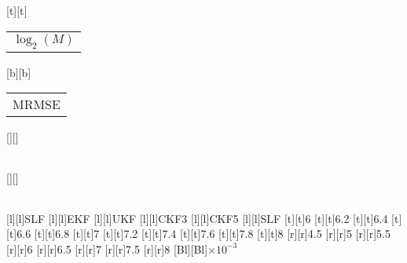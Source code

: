 %
%
[t][t]{\color[rgb]{0,0,0}\setlength{\tabcolsep}{0pt}\begin{tabular}{c}$\log_2 (M)$\end{tabular}}%
[b][b]{\color[rgb]{0,0,0}\setlength{\tabcolsep}{0pt}\begin{tabular}{c}MRMSE\end{tabular}}%
[][]{\color[rgb]{0,0,0}\setlength{\tabcolsep}{0pt}\begin{tabular}{c} \end{tabular}}%
[][]{\color[rgb]{0,0,0}\setlength{\tabcolsep}{0pt}\begin{tabular}{c} \end{tabular}}%
[l][l]{\color[rgb]{0,0,0}SLF}%
[l][l]{\color[rgb]{0,0,0}EKF}%
[l][l]{\color[rgb]{0,0,0}UKF}%
[l][l]{\color[rgb]{0,0,0}CKF3}%
[l][l]{\color[rgb]{0,0,0}CKF5}%
[l][l]{\color[rgb]{0,0,0}SLF}%
%
[t][t]{6}%
[t][t]{6.2}%
[t][t]{6.4}%
[t][t]{6.6}%
[t][t]{6.8}%
[t][t]{7}%
[t][t]{7.2}%
[t][t]{7.4}%
[t][t]{7.6}%
[t][t]{7.8}%
[t][t]{8}%
%
[r][r]{4.5}%
[r][r]{5}%
[r][r]{5.5}%
[r][r]{6}%
[r][r]{6.5}%
[r][r]{7}%
[r][r]{7.5}%
[r][r]{8}%
[Bl][Bl]{$\times 10^{-3}$}%
%
%
